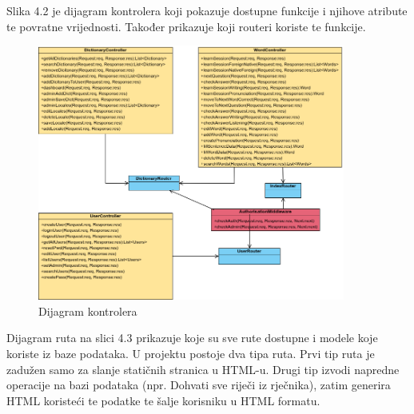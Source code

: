             Slika 4.2 je dijagram kontrolera koji pokazuje dostupne funkcije i njihove atribute te povratne vrijednosti. Također prikazuje koji routeri koriste te funkcije.
				\begin{figure}[H]
					\includegraphics[width=0.9\textwidth]{dijagrami/slika1.png} 
					\centering
					\caption{Dijagram kontrolera}
					\label{fig:class_diagram}
				\end{figure}			
			\eject
            Dijagram ruta na slici 4.3 prikazuje koje su sve rute dostupne i modele koje koriste iz baze podataka. U projektu postoje dva tipa ruta. Prvi tip ruta je zadužen samo za slanje statičnih stranica u HTML-u. Drugi tip izvodi napredne operacije na bazi podataka (npr. Dohvati sve riječi iz rječnika), zatim generira HTML koristeći te podatke te šalje korisniku u HTML formatu.
           
